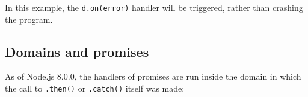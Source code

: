 \begin{Shaded}
\begin{Highlighting}[]
\OperatorTok{=} \NormalTok{(}\NormalTok{)}\OperatorTok{;}
\OperatorTok{=} \NormalTok{(}\NormalTok{)}\OperatorTok{;}
\OperatorTok{=}\NormalTok{()}\OperatorTok{;}
\NormalTok{(}\OperatorTok{,}\KeywordTok{=\textgreater{}}\NormalTok{ \{}
  \NormalTok{(}\OperatorTok{,}\OperatorTok{;}
\NormalTok{\})}\OperatorTok{;}
\NormalTok{(() }\KeywordTok{=\textgreater{}}\NormalTok{ \{}
  \NormalTok{(() }\KeywordTok{=\textgreater{}}\NormalTok{ \{}
    \NormalTok{(() }\KeywordTok{=\textgreater{}}\NormalTok{ \{ }
\NormalTok{(}\OperatorTok{,} \OperatorTok{,}\OperatorTok{,}\KeywordTok{=\textgreater{}}\NormalTok{ \{}
        \OperatorTok{;}
\NormalTok{      \})}\OperatorTok{;}
\NormalTok{    \}}\OperatorTok{,} \NormalTok{)}\OperatorTok{;}
\NormalTok{  \})}\OperatorTok{;}
\NormalTok{\})}\OperatorTok{;}
\end{Highlighting}
\end{Shaded}

In this example, the
\texttt{d.on(\textquotesingle{}error\textquotesingle{})} handler will be
triggered, rather than crashing the program.

\subsection{Domains and promises}\label{domains-and-promises}

As of Node.js 8.0.0, the handlers of promises are run inside the domain
in which the call to \texttt{.then()} or \texttt{.catch()} itself was
made:

